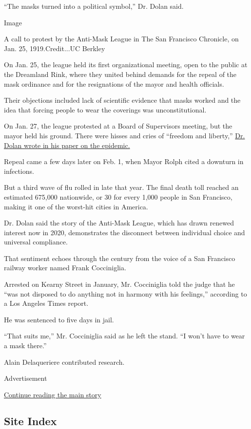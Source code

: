 ``The masks turned into a political symbol,'' Dr. Dolan said.

Image

A call to protest by the Anti-Mask League in The San Francisco
Chronicle, on Jan. 25, 1919.Credit...UC Berkley

On Jan. 25, the league held its first organizational meeting, open to
the public at the Dreamland Rink, where they united behind demands for
the repeal of the mask ordinance and for the resignations of the mayor
and health officials.

Their objections included lack of scientific evidence that masks worked
and the idea that forcing people to wear the coverings was
unconstitutional.

On Jan. 27, the league protested at a Board of Supervisors meeting, but
the mayor held his ground. There were hisses and cries of ``freedom and
liberty,'' \href{https://escholarship.org/uc/item/5q91q53r}{Dr. Dolan
wrote in his paper on the epidemic.}

Repeal came a few days later on Feb. 1, when Mayor Rolph cited a
downturn in infections.

But a third wave of flu rolled in late that year. The final death toll
reached an estimated 675,000 nationwide, or 30 for every 1,000 people in
San Francisco, making it one of the worst-hit cities in America.

Dr. Dolan said the story of the Anti-Mask League, which has drawn
renewed interest now in 2020, demonstrates the disconnect between
individual choice and universal compliance.

That sentiment echoes through the century from the voice of a San
Francisco railway worker named Frank Cocciniglia.

Arrested on Kearny Street in January, Mr. Cocciniglia told the judge
that he ``was not disposed to do anything not in harmony with his
feelings,'' according to a Los Angeles Times report.

He was sentenced to five days in jail.

``That suits me,'' Mr. Cocciniglia said as he left the stand. ``I won't
have to wear a mask there.''

Alain Delaqueriere contributed research.

Advertisement

\protect\hyperlink{after-bottom}{Continue reading the main story}

\hypertarget{site-index}{%
\subsection{Site Index}\label{site-index}}


